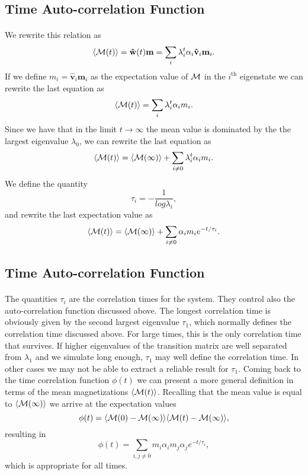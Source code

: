 \documentclass[%
twoside,                 %
final,                   %
10pt]{article}
\begin{document}
\subsection{Time Auto-correlation Function}

\paragraph{}
We rewrite this relation  as
 \[
 \langle {\cal M}(t) \rangle  = \mathbf{\hat{w}}(t)\mathbf{m}=\sum_i\lambda_i^t\alpha_i\mathbf{\hat{v}}_i\mathbf{m}_i.
\] 
If we define $m_i=\mathbf{\hat{v}}_i\mathbf{m}_i$ as the expectation value of
${\cal M}$ in the $i^{\mathrm{th}}$ eigenstate we can rewrite the last equation as
 \[
 \langle {\cal M}(t) \rangle  = \sum_i\lambda_i^t\alpha_im_i.
\] 
Since we have that in the limit $t\rightarrow \infty$ the mean value is dominated by the 
the largest eigenvalue $\lambda_0$, we can rewrite the last equation as
 \[
 \langle {\cal M}(t) \rangle  = \langle {\cal M}(\infty) \rangle+\sum_{i\ne 0}\lambda_i^t\alpha_im_i.
\] 
We define the quantity
\[
   \tau_i=-\frac{1}{log\lambda_i},
\]
and rewrite the last expectation value as
 \[
 \langle {\cal M}(t) \rangle  = \langle {\cal M}(\infty) \rangle+\sum_{i\ne 0}\alpha_im_ie^{-t/\tau_i}.
\label{eq:finalmeanm}
\]




\subsection{Time Auto-correlation Function}

\paragraph{}

The quantities $\tau_i$ are the correlation times for the system. They control also the auto-correlation function 
discussed above.  The longest correlation time is obviously given by the second largest
eigenvalue $\tau_1$, which normally defines the correlation time discussed above. For large times, this is the 
only correlation time that survives. If higher eigenvalues of the transition matrix are well separated from 
$\lambda_1$ and we simulate long enough,  $\tau_1$ may well define the correlation time. 
In other cases we may not be able to extract a reliable result for $\tau_1$. 
Coming back to the time correlation function $\phi(t)$ we can present a more general definition in terms
of the mean magnetizations $ \langle {\cal M}(t) \rangle$. Recalling that the mean value is equal 
to $ \langle {\cal M}(\infty) \rangle$ we arrive at the expectation values
\[
\phi(t) =\langle {\cal M}(0)-{\cal M}(\infty)\rangle \langle {\cal M}(t)-{\cal M}(\infty)\rangle,
\]
resulting in
\[
\phi(t) =\sum_{i,j\ne 0}m_i\alpha_im_j\alpha_je^{-t/\tau_i},
\]
which is appropriate for all times.
\end{document}

